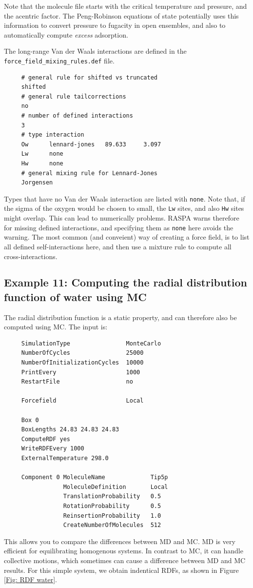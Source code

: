 Note that the molecule file starts with the critical temperature and pressure, and the acentric factor.
The Peng-Robinson equations of state potentially uses this information to convert pressure to fugacity in open ensembles,
and also to automatically compute \emph{excess }adsorption.

The long-range Van der Waals interactions are defined in the \verb+force_field_mixing_rules.def+ file.
\begin{tiny}
\begin{verbatim}
     # general rule for shifted vs truncated
     shifted
     # general rule tailcorrections
     no
     # number of defined interactions
     3
     # type interaction
     Ow      lennard-jones   89.633     3.097
     Lw      none
     Hw      none
     # general mixing rule for Lennard-Jones
     Jorgensen
\end{verbatim}
\end{tiny}
Types that have no Van der Waals interaction are listed with \verb+none+. Note that, if the sigma of the oxygen 
would be chosen to small, the \verb+Lw+ sites, and also \verb+Hw+ sites might overlap.
This can lead to numerically problems. RASPA warns therefore for missing defined interactions, and specifying them as \verb+none+ here avoids the warning.
The most common (and conveient) way of creating a force field, is to list all defined self-interactions here, and then use a mixture rule to compute
all cross-interactions.


\subsection*{Example 11: Computing the radial distribution function of water using MC}

The radial distribution function is a static property, and can therefore also be computed using MC.
The input is:
\begin{tiny}
\begin{verbatim}
     SimulationType                MonteCarlo
     NumberOfCycles                25000
     NumberOfInitializationCycles  10000
     PrintEvery                    1000
     RestartFile                   no
     
     Forcefield                    Local
     
     Box 0
     BoxLengths 24.83 24.83 24.83
     ComputeRDF yes
     WriteRDFEvery 1000
     ExternalTemperature 298.0
     
     Component 0 MoleculeName             Tip5p
                 MoleculeDefinition       Local
                 TranslationProbability   0.5
                 RotationProbability      0.5
                 ReinsertionProbability   1.0
                 CreateNumberOfMolecules  512
\end{verbatim}
\end{tiny}
This allows you to compare the differences between MD and MC. MD is very efficient for equilibrating homogenous systems.
In contrast to MC, it can handle collective motions, which sometimes can cause a difference between MD and MC results.
For this simple system, we obtain indentical RDFs, as shown in Figure \ref{Fig: RDF water}.


